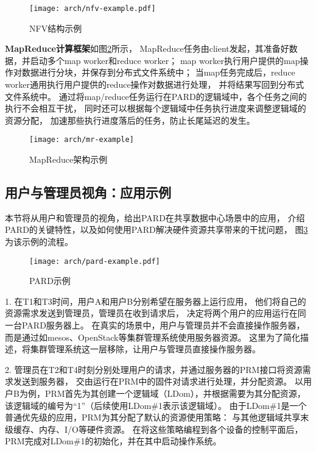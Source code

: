 \begin{figure}[htb]
  \centering
  \texttt{[image: arch/nfv-example.pdf]}
  \caption{NFV结构示例\cite{etsi_nfv_2014}}
  \label{fig:nfv-example}
\end{figure}


\textbf{MapReduce计算框架}如图\ref{fig:mr-example}所示，
MapReduce任务由client发起，其准备好数据，并启动多个map worker和reduce worker；
map worker执行用户提供的map操作对数据进行分块，并保存到分布式文件系统中；
当map任务完成后，reduce worker通用执行用户提供的reduce操作对数据进行处理，
并将结果写回到分布式文件系统中。
通过将map/reduce任务运行在PARD的逻辑域中，各个任务之间的执行不会相互干扰，
同时还可以根据每个逻辑域中任务执行进度来调整逻辑域的资源分配，
加速那些执行进度落后的任务，防止长尾延迟的发生。

\begin{figure}[htb]
  \centering
  \texttt{[image: arch/mr-example]}
  \caption{MapReduce架构示例}
  \label{fig:mr-example}
\end{figure}


\subsection{用户与管理员视角：应用示例}

本节将从用户和管理员的视角，给出PARD在共享数据中心场景中的应用，
介绍PARD的关键特性，以及如何使用PARD解决硬件资源共享带来的干扰问题，
图\ref{fig:pard-example}为该示例的流程。

\begin{figure}[b]
  \centering
  \texttt{[image: arch/pard-example.pdf]}
  \caption{PARD示例}
  \label{fig:pard-example}
\end{figure}

1. 在T1和T3时间，用户A和用户B分别希望在服务器上运行应用，
他们将自己的资源需求发送到管理员，管理员在收到请求后，
决定将两个用户的应用运行在同一台PARD服务器上。
在真实的场景中，用户与管理员并不会直接操作服务器，
而是通过如mesos\cite{Hindman:2011:Mesos}、OpenStack\cite{OpenStack}等集群管理系统使用服务器资源。
这里为了简化描述，将集群管理系统这一层移除，让用户与管理员直接操作服务器。

2. 管理员在T2和T4时刻分别处理用户的请求，并通过服务器的PRM接口将资源需求发送到服务器，
交由运行在PRM中的固件对请求进行处理，并分配资源。
以用户B为例，PRM首先为其创建一个逻辑域（LDom），并根据需要为其分配资源，
该逻辑域的编号为``1''（后续使用LDom\#1表示该逻辑域）。
由于LDom\#1是一个普通优先级的应用，PRM为其分配了默认的资源使用策略：
与其他逻辑域共享末级缓存、内存、I/O等硬件资源。
在将这些策略编程到各个设备的控制平面后，PRM完成对LDom\#1的初始化，并在其中启动操作系统。

